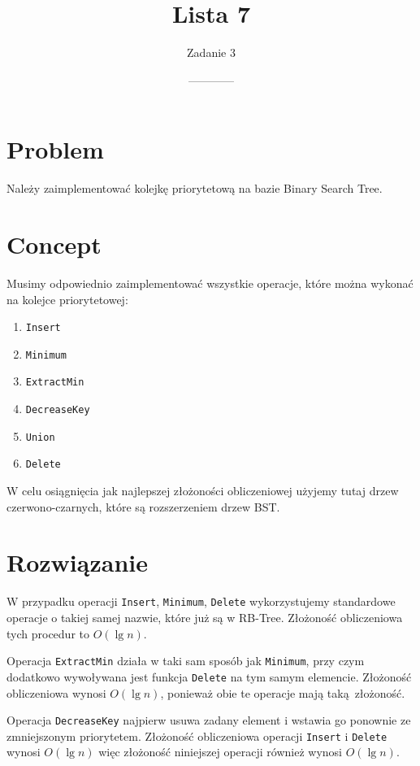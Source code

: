 \documentclass[14pt]{article}
\title{Lista 7}
\author{Zadanie 3}
\date{------------}
\begin{document}
\maketitle

\section{Problem}

Należy zaimplementować kolejkę priorytetową na bazie Binary Search Tree.

\section{Concept}

Musimy odpowiednio zaimplementować wszystkie operacje, które można wykonać na kolejce priorytetowej:
\begin{enumerate}
  \item \texttt{Insert}
  \item \texttt{Minimum}
  \item \texttt{ExtractMin}
  \item \texttt{DecreaseKey}
  \item \texttt{Union}
  \item \texttt{Delete}
\end{enumerate}

W celu osiągnięcia jak najlepszej złożoności obliczeniowej użyjemy tutaj drzew czerwono-czarnych, które są rozszerzeniem drzew BST.

\section{Rozwiązanie}

W przypadku operacji \texttt{Insert}, \texttt{Minimum}, \texttt{Delete} wykorzystujemy standardowe operacje o takiej samej nazwie, które już są w RB-Tree. Złożoność obliczeniowa tych procedur to $O(\lg n)$.

Operacja \texttt{ExtractMin} działa w taki sam sposób jak \texttt{Minimum}, przy czym dodatkowo wywoływana jest funkcja \texttt{Delete} na tym samym elemencie. Złożoność obliczeniowa wynosi $O(\lg n)$, ponieważ obie te operacje mają taką złożoność.

Operacja \texttt{DecreaseKey} najpierw usuwa zadany element i wstawia go ponownie ze zmniejszonym priorytetem. Złożoność obliczeniowa operacji \texttt{Insert} i \texttt{Delete} wynosi $O(\lg n)$ więc złożoność niniejszej operacji również wynosi $O(\lg n)$.
\end{document}
